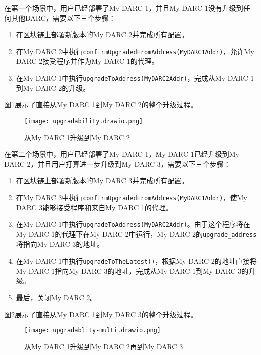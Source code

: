 \documentclass[main.tex]{subfiles}
\begin{document}
在第一个场景中，用户已经部署了My DARC 1，并且My DARC 1没有升级到任何其他DARC，需要以下三个步骤：

\begin{enumerate}
    \item 在区块链上部署新版本的My DARC 2并完成所有配置。
    \item 在My DARC 2中执行\texttt{confirmUpgradedFromAddress(MyDARC1Addr)}，允许My DARC 2接受程序并作为My DARC 1的代理。
    \item 在My DARC 1中执行\texttt{upgradeToAddress(MyDARC2Addr)}，完成从My DARC 1到My DARC 2的升级。
\end{enumerate}

图\ref{fig:upgrade}展示了直接从My DARC 1到My DARC 2的整个升级过程。


\begin{figure}
\centering
\texttt{[image: upgradability.drawio.png]}
\caption{\label{fig:upgrade}从My DARC 1升级到My DARC 2}
\end{figure}


在第二个场景中，用户已经部署了My DARC 1，My DARC 1已经升级到My DARC 2，并且用户打算进一步升级到My DARC 3，需要以下三个步骤：

\begin{enumerate}
    \item 在区块链上部署新版本的My DARC 3并完成所有配置。
    \item 在My DARC 3中执行\texttt{confirmUpgradedFromAddress(MyDARC1Addr)}，使My DARC 3能够接受程序和来自My DARC 1的代理。
    \item 在My DARC 1中执行\texttt{upgradeToAddress(MyDARC2Addr)}。由于这个程序将在My DARC 1的代理下在My DARC 2中运行，My DARC 2的\texttt{upgrade\_address}将指向My DARC 3的地址。
    \item 在My DARC 1中执行\texttt{upgradeToTheLatest()}，根据My DARC 2的地址直接将My DARC 1指向My DARC 3的地址，完成从My DARC 1到My DARC 3的升级。
    \item 最后，关闭My DARC 2。
\end{enumerate}

图\ref{fig:upgrade-multi}展示了直接从My DARC 1到My DARC 3的整个升级过程。






\begin{figure}
\centering
\texttt{[image: upgradablity-multi.drawio.png]}
\caption{\label{fig:upgrade-multi}从My DARC 1升级到My DARC 2再到My DARC 3}
\end{figure}
\end{document}
